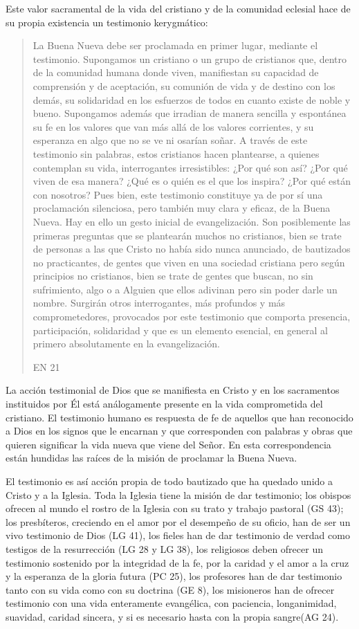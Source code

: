 Este valor sacramental de la vida del cristiano y de la comunidad eclesial hace de su propia existencia un testimonio kerygmático: \blockquote[EN 21]{La Buena Nueva debe ser proclamada en primer lugar, mediante el testimonio. Supongamos un cristiano o un grupo de cristianos que, dentro de la comunidad humana donde viven, manifiestan su capacidad de comprensión y de aceptación, su comunión de vida y de destino con los demás, su solidaridad en los esfuerzos de todos en cuanto existe de noble y bueno. Supongamos además que irradian de manera sencilla y espontánea su fe en los valores que van más allá de los valores corrientes, y su esperanza en algo que no se ve ni osarían soñar. A través de este testimonio sin palabras, estos cristianos hacen plantearse, a quienes contemplan su vida, interrogantes irresistibles: ¿Por qué son así? ¿Por qué viven de esa manera? ¿Qué es o quién es el que los inspira? ¿Por qué están con nosotros? Pues bien, este testimonio constituye ya de por sí una proclamación silenciosa, pero también muy clara y eficaz, de la Buena Nueva. Hay en ello un gesto inicial de evangelización. Son posiblemente las primeras preguntas que se plantearán muchos no cristianos, bien se trate de personas a las que Cristo no había sido nunca anunciado, de bautizados no practicantes, de gentes que viven en una sociedad cristiana pero según principios no cristianos, bien se trate de gentes que buscan, no sin sufrimiento, algo o a Alguien que ellos adivinan pero sin poder darle un nombre. Surgirán otros interrogantes, más profundos y más comprometedores, provocados por este testimonio que comporta presencia, participación, solidaridad y que es un elemento esencial, en general al primero absolutamente en la evangelización.} La acción testimonial de Dios que se manifiesta en Cristo y en los sacramentos instituidos por Él está análogamente presente en la vida comprometida del cristiano. El testimonio humano es respuesta de fe de aquellos que han reconocido a Dios en los signos que le encarnan y que corresponden con palabras y obras que quieren significar la vida nueva que viene del Señor. En esta correspondencia están hundidas las raíces de la misión de proclamar la Buena Nueva.

El testimonio es así acción propia de todo bautizado que ha quedado unido a Cristo y a la Iglesia.\autocite[Cf.][188]{prades2015testimonio} Toda la Iglesia tiene la misión de dar testimonio; los obispos ofrecen al mundo el rostro de la Iglesia con su trato y trabajo pastoral (GS 43); los presbíteros, creciendo en el amor por el desempeño de su oficio, han de ser un vivo testimonio de Dios (LG 41), los fieles han de dar testimonio de verdad como testigos de la resurrección (LG 28 y LG 38), los religiosos deben ofrecer un testimonio sostenido por la integridad de la fe, por la caridad y el amor a la cruz y la esperanza de la gloria futura (PC 25), los profesores han de dar testimonio tanto con su vida como con su doctrina (GE 8), los misioneros han de ofrecer testimonio con una vida enteramente evangélica, con paciencia, longanimidad, suavidad, caridad sincera, y si es necesario hasta con la propia sangre(AG 24).

